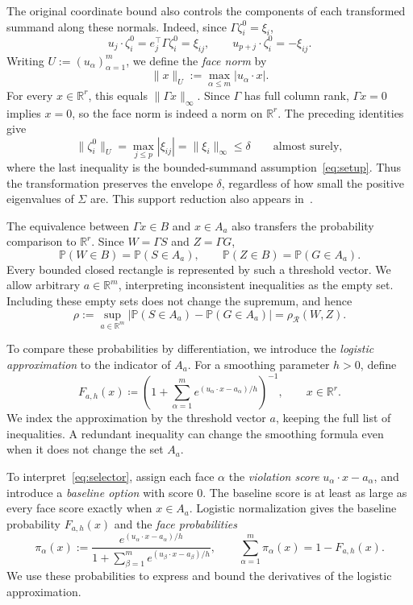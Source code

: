 \documentclass[11pt,letterpaper,twoside,leqno]{article}
\theoremstyle{bookplain}
\theoremstyle{bookremark}
\newcommand{\Pp}{\mathbb P}
\newcommand{\R}{\mathbb R}
\newcommand{\rh}{\rho_{\mathcal R}}
\begin{document}
The original coordinate bound also controls the components of each
transformed summand along these normals. Indeed, since
\(\Gamma\zeta_i^0=\xi_i\),
\[
 u_j\cdot\zeta_i^0=e_j^\top\Gamma\zeta_i^0=\xi_{ij},
 \qquad u_{p+j}\cdot\zeta_i^0=-\xi_{ij}.
\]
Writing \(U:=(u_\alpha)_{\alpha=1}^m\), we define the \emph{face norm} by
\[
 \|x\|_U:=\max_{\alpha\le m}|u_\alpha\cdot x|.
\]
{
For every \(x\in\R^r\), this equals \(\|\Gamma x\|_\infty\).
Since \(\Gamma\) has full column rank, \(\Gamma x=0\) implies \(x=0\),
so the face norm is indeed a norm on \(\R^r\).
}
The preceding identities give
\[
 \|\zeta_i^0\|_U=\max_{j\le p}|\xi_{ij}|
 =\|\xi_i\|_\infty\le\delta\qquad\text{almost surely},
\]
where the last inequality is the bounded-summand assumption~\eqref{eq:setup}.
Thus the transformation preserves the envelope \(\delta\), regardless
of how small the positive eigenvalues of \(\Sigma\) are. This support reduction also appears in~\cite[Section~2.3]{GaoZhang}.

{
The equivalence between \(\Gamma x\in B\) and \(x\in A_a\) also
transfers the probability comparison to \(\R^r\). Since
\(W=\Gamma S\) and \(Z=\Gamma G\),
\[
 \Pp(W\in B)=\Pp(S\in A_a),\qquad
 \Pp(Z\in B)=\Pp(G\in A_a).
\]
Every bounded closed rectangle is represented by such a threshold
vector. We allow arbitrary \(a\in\R^m\), interpreting inconsistent
inequalities as the empty set. Including these empty sets does not
change the supremum, and hence
\[
 \rho:=\sup_{a\in\R^m}
 |\Pp(S\in A_a)-\Pp(G\in A_a)|=\rh(W,Z).
\]
}

To compare these probabilities by differentiation, we introduce the
\emph{logistic approximation} to the indicator of \(A_a\). For a smoothing
parameter \(h>0\), define
\begin{equation}
 F_{a,h}(x)\coloneqq
 \left(1+\sum_{\alpha=1}^m
 e^{(u_\alpha\cdot x-a_\alpha)/h}\right)^{-1},
 \qquad x\in\R^r.
 \label{eq:selector}
\end{equation}
{
We index the approximation by the threshold vector \(a\), keeping the
full list of inequalities. A redundant inequality can change the
smoothing formula even when it does not change the set \(A_a\).
}

{
To interpret~\eqref{eq:selector}, assign each face \(\alpha\) the
\emph{violation score} \(u_\alpha\cdot x-a_\alpha\), and introduce a
\emph{baseline option} with score \(0\). The baseline score is at least
as large as every face score exactly when \(x\in A_a\). Logistic
normalization gives the baseline probability \(F_{a,h}(x)\) and the
\emph{face probabilities}
\[
 \pi_\alpha(x):=
 \frac{e^{(u_\alpha\cdot x-a_\alpha)/h}}
 {1+\sum_{\beta=1}^m e^{(u_\beta\cdot x-a_\beta)/h}},
 \qquad \sum_{\alpha=1}^m\pi_\alpha(x)=1-F_{a,h}(x).
\]
We use these probabilities to express and bound the derivatives of
the logistic approximation.
}
\end{document}
